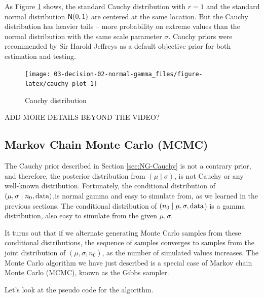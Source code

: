 \documentclass[]{book}
\theoremstyle{definition}
\theoremstyle{definition}
\theoremstyle{definition}
\theoremstyle{remark}
\begin{document}
As Figure \ref{fig:cauchy-plot} shows, the standard Cauchy distribution
with \(r=1\) and the standard normal distribution \(\textsf{N}(0,1)\) are
centered at the same location. But the Cauchy distribution has heavier
tails -- more probability on extreme values than the normal distribution
with the same scale parameter \(\sigma\). Cauchy priors were recommended
by Sir Harold Jeffreys as a default objective prior for both estimation
and testing.

\begin{figure}

{\centering \texttt{[image: 03-decision-02-normal-gamma\_files/figure-latex/cauchy-plot-1]} 

}

\caption{Cauchy distribution}\label{fig:cauchy-plot}
\end{figure}

ADD MORE DETAILS BEYOND THE VIDEO?

\subsection{Markov Chain Monte Carlo (MCMC)}\label{sec:NG-MCMC}

The Cauchy prior described in Section \ref{sec:NG-Cauchy} is not a
contrary prior, and therefore, the posterior distribution from
\((\mu \mid \sigma)\), is not Cauchy or any well-known distribution.
Fortunately, the conditional distribution of
\((\mu, \sigma \mid n_0, \text{data})\),is normal gamma and easy to simulate
from, as we learned in the previous sections. The conditional
distribution of \((n_0 \mid \mu, \sigma, \text{data}\)) is a gamma
distribution, also easy to simulate from the given \(\mu, \sigma\).

It turns out that if we alternate generating Monte Carlo samples from
these conditional distributions, the sequence of samples converges to
samples from the joint distribution of \((\mu, \sigma, n_0)\), as the
number of simulated values increases. The Monte Carlo algorithm we have
just described is a special case of Markov chain Monte Carlo (MCMC),
known as the Gibbs sampler.

Let's look at the pseudo code for the algorithm.
\end{document}
